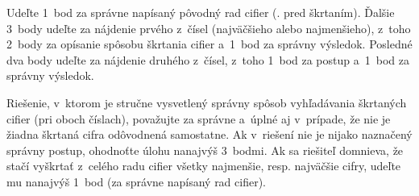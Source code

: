 {\hodnotenie
Udeľte 1~bod za správne napísaný pôvodný rad cifier (\tj. pred škrtaním).
Ďalšie 3~body udeľte za nájdenie prvého z~čísel (najväčšieho alebo
najmenšieho), z~toho 2~body za opísanie spôsobu škrtania cifier a~1~bod za
správny výsledok.
Posledné dva body udeľte za nájdenie druhého z~čísel, z~toho 1~bod za postup
a~1~bod za správny výsledok.

Riešenie, v~ktorom je stručne vysvetlený správny spôsob vyhľadávania škrtaných
cifier (pri oboch číslach), považujte za správne a~úplné aj v~prípade, že nie je žiadna
škrtaná cifra odôvodnená samostatne.
Ak v~riešení nie je nijako naznačený správny postup, ohodnoťte úlohu
nanajvýš 3~bodmi.
Ak sa riešiteľ domnieva, že stačí vyškrtať z~celého radu cifier všetky
najmenšie, resp. najväčšie cifry, udeľte mu nanajvýš 1~bod (za správne
napísaný rad cifier).
\endhodnotenie
}

